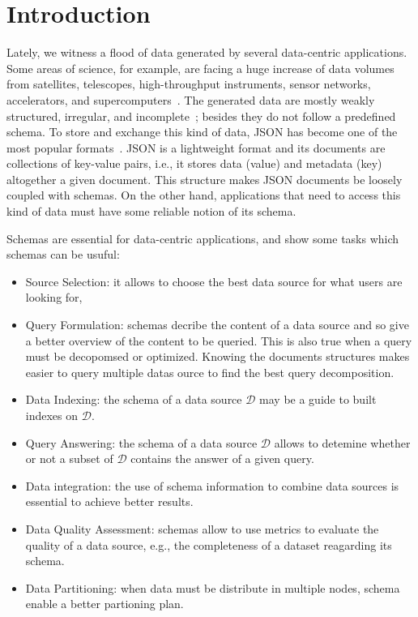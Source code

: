 \section{Introduction}
\label{sec:intro}

\color{blue} 

Lately, we witness a flood of data generated by several data-centric applications. 
Some areas of science, for example, are facing a huge increase of data volumes from satellites, telescopes, high-throughput instruments, sensor networks, accelerators, and supercomputers~\citep{BHS09}. 
The generated data are mostly weakly structured, irregular, and incomplete~\citep{Ke+22}; besides they do not follow a predefined schema. 
To store and exchange this kind of data, JSON has become one of the most popular formats~\citep{bourhis2017json}. 
JSON is a lightweight format and its documents are collections of key-value pairs, i.e., it stores data (value) and metadata (key) altogether a given document. 
This structure makes JSON documents be loosely coupled with schemas. 
On the other hand, applications that need to access this kind of data must have some reliable notion of its schema. 

Schemas are essential for data-centric applications, and \citep{Ke+22} show some tasks which schemas can be usuful:

\begin{itemize}

  \item Source Selection: it allows to choose the best data source for what users are looking for,
   
  \item Query Formulation: schemas decribe the content of a data source and so give a better overview of the content to be queried. 
  This is also true when a query must be decopomsed or optimized. 
  Knowing the documents structures makes easier to query multiple datas ource to find the best query decomposition.

  \item Data Indexing: the schema of a data source $\mathcal{D}$ may be a guide to built indexes on $\mathcal{D}$.
  
  \item Query Answering: the schema of a data source $\mathcal{D}$ allows to detemine whether or not a subset of $\mathcal{D}$ contains the answer of a given query.
  
  \item Data integration: the use of schema information to combine data sources is essential to achieve better results.
  
  \item Data Quality Assessment: schemas allow to use metrics to evaluate the quality of a data source, e.g., the completeness of a dataset reagarding its schema.
  
  \item Data Partitioning: when data must be distribute in multiple nodes, schema enable a better partioning plan.
\end{itemize} 


